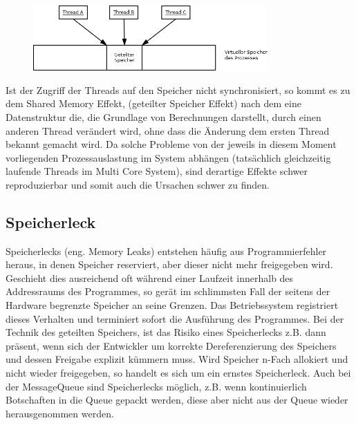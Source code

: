 \documentclass[12pt,oneside,a4paper,bibtotoc,liststotoc]{scrreprt}
\begin{document}
\begin{figure}[H]
  \begin{centering}
    \includegraphics[width=0.8\textwidth]{img/SharedMemory_RaceCondition.png}
    \label{SharedMemory_RaceCondition}
  \end{centering}
\end{figure}
Ist der Zugriff der Threads auf den Speicher nicht synchronisiert, so kommt es zu dem Shared Memory Effekt, (geteilter Speicher Effekt) nach dem eine Datenstruktur die, die Grundlage von Berechnungen darstellt, durch einen anderen Thread verändert wird, ohne dass die Änderung dem ersten Thread bekannt gemacht wird. Da solche Probleme von der jeweils in diesem Moment vorliegenden Prozessauslastung im System abhängen (tatsächlich gleichzeitig laufende Threads im Multi Core System), sind derartige Effekte schwer reproduzierbar und somit auch die Ursachen schwer zu finden.


\subsection{Speicherleck}
Speicherlecks (eng. Memory Leaks) entstehen häufig aus Programmierfehler heraus, in denen Speicher reserviert, aber dieser nicht mehr freigegeben wird. Geschieht dies ausreichend oft während einer Laufzeit innerhalb des Addressraums des Programmes, so gerät im schlimmsten Fall der seitens der Hardware begrenzte Speicher an seine Grenzen. Das Betriebssystem registriert dieses Verhalten und terminiert sofort die Ausführung des Programmes. Bei der Technik des geteilten Speichers, ist das Risiko eines Speicherlecks z.B. dann präsent, wenn sich der Entwickler um korrekte Dereferenzierung des Speichers und dessen Freigabe explizit kümmern muss. Wird Speicher n-Fach allokiert und nicht wieder freigegeben, so handelt es sich um ein ernstes Speicherleck. Auch bei der MessageQueue sind Speicherlecks möglich, z.B. wenn kontinuierlich Botschaften in die Queue gepackt werden, diese aber nicht aus der Queue wieder herausgenommen werden.
\end{document}
